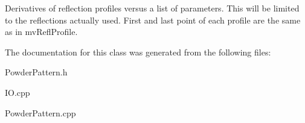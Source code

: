 Derivatives of reflection profiles versus a list of parameters. This will be limited to the reflections actually used. First and last point of each profile are the same as in mv\+Refl\+Profile. 

The documentation for this class was generated from the following files\+:\begin{DoxyCompactItemize}
\item 
Powder\+Pattern.\+h\item 
I\+O.\+cpp\item 
Powder\+Pattern.\+cpp\end{DoxyCompactItemize}
